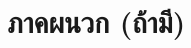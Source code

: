 \documentclass[11pt,a4paper]{article}
\begin{document}











\section{ภาคผนวก (ถ้ามี)}
\end{document}
